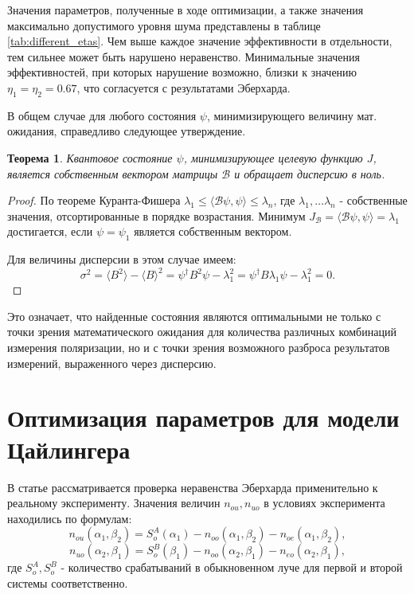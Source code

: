 \documentclass[%
master,         %
subf,           %
href,           %
colorlinks=true %
]{disser}
\numberwithin{equation}{section}
\numberwithin{figure}{section}
\newtheorem{theorem}{Теорема}[section]
\begin{document}
\endgroup

Значения параметров, полученные в ходе оптимизации, а также значения максимально допустимого уровня шума представлены в таблице \ref{tab:different_etas}. Чем выше каждое значение эффективности в отдельности, тем сильнее может быть нарушено неравенство. Минимальные значения эффективностей, при которых нарушение возможно, близки к значению $\eta_1 = \eta_2 = 0.67$, что согласуется с результатами Эберхарда.


В общем случае для любого состояния $\psi$, минимизирующего величину мат. ожидания, справедливо следующее утверждение.

\begin{theorem}
Квантовое состояние $\psi$, минимизирующее целевую функцию $J$, является собственным вектором матрицы $\mathcal{B}$ и обращает дисперсию в ноль.
\end{theorem}
\begin{proof}
По теореме Куранта-Фишера $\lambda_1 \leq \langle\mathcal{B}\psi, \psi\rangle \leq \lambda_n$, где $\lambda_1, \ldots \lambda_n$ - собственные значения, отсортированные в порядке возрастания. Минимум $J_\mathcal{B} = \langle\mathcal{B}\psi, \psi\rangle = \lambda_1$ достигается, если $\psi = \psi_1$ является собственным вектором. 

Для величины дисперсии в этом случае имеем:
\[\sigma^2 = \langle B^2\rangle - \langle B\rangle^2 = \psi^\dagger B^2 \psi - \lambda_1^2 = \psi^\dagger B \lambda_1  \psi - \lambda_1^2 = 0.
\]
\end{proof}

Это означает, что найденные состояния являются оптимальными не только с точки зрения математического ожидания для количества различных комбинаций измерения поляризации, но и с точки зрения возможного разброса результатов измерений, выраженного через дисперсию.

\section{Оптимизация параметров для модели Цайлингера}
В статье \cite{Zeilinger} рассматривается проверка неравенства Эберхарда применительно к реальному эксперименту. Значения величин $n_{ou}, n_{uo}$ в условиях эксперимента находились по формулам:
\[
n_{ou}(\alpha_1, \beta_2) = S_o^A(\alpha_1) - n_{oo}(\alpha_1, \beta_2) - n_{oe}(\alpha_1, \beta_2),
\]
\[
n_{uo}(\alpha_2, \beta_1) = S_o^B(\beta_1) - n_{oo}(\alpha_2, \beta_1) - n_{eo}(\alpha_2, \beta_1),
\]
где $S_o^A, S_o^B$ - количество срабатываний в обыкновенном луче для первой и второй системы соответственно.
\end{document}

